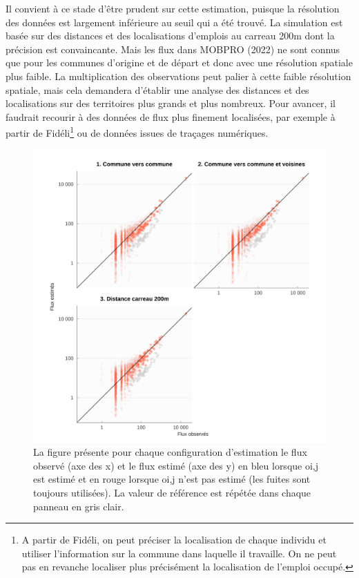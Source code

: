\documentclass[
  10pt,
  a4paper,
  numbers=noendperiod,
  DIV=9]{scrartcl}
\begin{document}
Il convient à ce stade d'être prudent sur cette estimation, puisque la
résolution des données est largement inférieure au seuil qui a été
trouvé. La simulation est basée sur des distances et des localisations
d'emplois au carreau 200m dont la précision est convaincante. Mais les
flux dans MOBPRO (2022) ne sont connus que pour les communes d'origine
et de départ et donc avec une résolution spatiale plus faible. La
multiplication des observations peut palier à cette faible résolution
spatiale, mais cela demandera d'établir une analyse des distances et des
localisations sur des territoires plus grands et plus nombreux. Pour
avancer, il faudrait recourir à des données de flux plus finement
localisées, par exemple à partir de Fidéli\footnote{A partir de Fidéli,
  on peut préciser la localisation de chaque individu et utiliser
  l'information sur la commune dans laquelle il travaille. On ne peut
  pas en revanche localiser plus précisément la localisation de l'emploi
  occupé.} ou de données issues de traçages numériques.

\begin{figure}[htb]

{\centering \includegraphics[width=1\textwidth,height=\textheight]{larochelle_files/figure-pdf/fig-actvsfit-p-1.png}

}

\caption[\emph{MEAPS} observés versus estimés, estimations
paramétriques]{\label{fig-actvsfit-p}La figure présente pour chaque
configuration d'estimation le flux observé (axe des x) et le flux estimé
(axe des y) en bleu lorsque oi,j est estimé et en rouge lorsque oi,j
n'est pas estimé (les fuites sont toujours utilisées). La valeur de
référence est répétée dans chaque panneau en gris clair.}

\end{figure}
\end{document}
